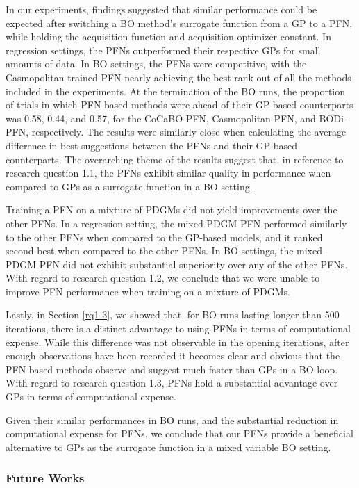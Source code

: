 \documentclass[12pt,twoside]{reedthesis}
\begin{document}
In our experiments, findings suggested that similar performance could be expected after switching a BO method's surrogate function from a GP to a PFN, while holding the acquisition function and acquisition optimizer constant. In regression settings, the PFNs outperformed their respective GPs for small amounts of data. In BO settings, the PFNs were competitive, with the Casmopolitan-trained PFN nearly achieving the best rank out of all the methods included in the experiments. At the termination of the BO runs, the proportion of trials in which PFN-based methods were ahead of their GP-based counterparts was 0.58, 0.44, and 0.57, for the CoCaBO-PFN, Casmopolitan-PFN, and BODi-PFN, respectively. The results were similarly close when calculating the average difference in best suggestions between the PFNs and their GP-based counterparts. The overarching theme of the results suggest that, in reference to research question 1.1, the PFNs exhibit similar quality in performance when compared to GPs as a surrogate function in a BO setting.

Training a PFN on a mixture of PDGMs did not yield improvements over the other PFNs. In a regression setting, the mixed-PDGM PFN performed similarly to the other PFNs when compared to the GP-based models, and it ranked second-best when compared to the other PFNs. In BO settings, the mixed-PDGM PFN did not exhibit substantial superiority over any of the other PFNs. With regard to research question 1.2, we conclude that we were unable to improve PFN performance when training on a mixture of PDGMs.

Lastly, in Section \ref{rq1-3}, we showed that, for BO runs lasting longer than 500 iterations, there is a distinct advantage to using PFNs in terms of computational expense. While this difference was not observable in the opening iterations, after enough observations have been recorded it becomes clear and obvious that the PFN-based methods observe and suggest much faster than GPs in a BO loop. With regard to research question 1.3, PFNs hold a substantial advantage over GPs in terms of computational expense.

Given their similar performances in BO runs, and the substantial reduction in computational expense for PFNs, we conclude that our PFNs provide a beneficial alternative to GPs as the surrogate function in a mixed variable BO setting.

\hypertarget{futureWork}{%
\subsubsection{Future Works}\label{futureWork}}
\end{document}
